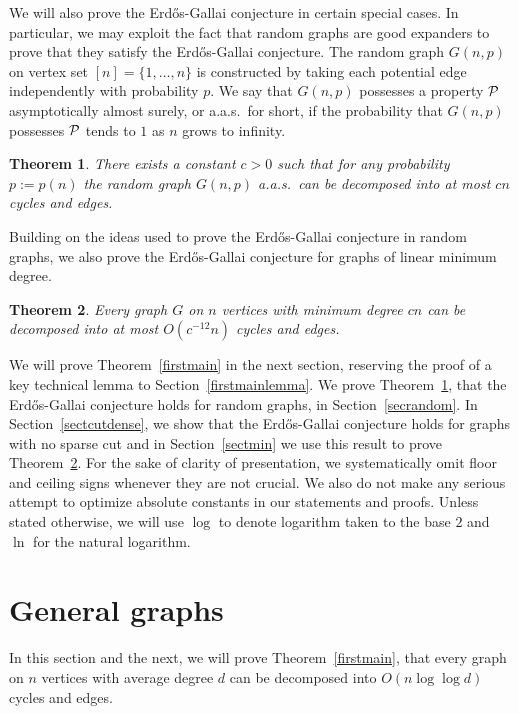 \documentclass[11pt]{article}
\newtheorem{theorem}{Theorem}[section]
\begin{document}
We will also prove the Erd\H{o}s-Gallai conjecture in certain special cases. In particular, we may exploit the fact that random graphs are good expanders to prove that they satisfy the Erd\H{o}s-Gallai conjecture. The random graph $G(n,p)$ on vertex set
$[n] = \{1, \dots ,n\}$ is constructed by taking each potential edge independently with probability $p$. We
say that $G(n,p)$ possesses a property $\cal P$ asymptotically almost surely, or a.a.s.~for 
short, if the probability that $G(n,p)$ possesses $\cal P$ tends to $1$ as $n$ grows to infinity.

\begin{theorem}\label{thmrandom}
There exists a constant $c > 0$ such that for any probability $p := p(n)$ the random graph $G(n,p)$ a.a.s.~can be decomposed into at most $cn$ cycles and edges.
\end{theorem}

Building on the ideas used to prove the Erd\H{o}s-Gallai conjecture in random graphs, we also prove the Erd\H{o}s-Gallai conjecture for graphs of linear minimum degree.

\begin{theorem} \label{EGlargemin}
Every graph $G$ on $n$ vertices with minimum degree $cn$ can be decomposed into at most $O(c^{-12}n)$ cycles and edges.
\end{theorem}

We will prove Theorem~\ref{firstmain} in the next section, reserving the proof of a key technical lemma to Section~\ref{firstmainlemma}. We prove Theorem~\ref{thmrandom}, that the Erd\H{o}s-Gallai conjecture holds for random graphs, in Section~\ref{secrandom}. In Section~\ref{sectcutdense}, we show that the Erd\H{o}s-Gallai conjecture holds for graphs with no sparse cut and in Section~\ref{sectmin} we use this result to prove Theorem~\ref{EGlargemin}.
For the sake of clarity of presentation, we systematically omit floor and ceiling signs whenever they are not crucial. We also do not make any serious attempt to optimize absolute constants in our statements and proofs. Unless stated otherwise, we will use $\log$ to denote logarithm taken to the base $2$ and $\ln$ for the natural logarithm.

\section{General graphs}
\label{sectproofs}

In this section and the next, we will prove Theorem~\ref{firstmain}, that every graph on $n$ vertices with average degree $d$ can be decomposed into $O(n \log \log d)$ cycles and edges.
\end{document}
